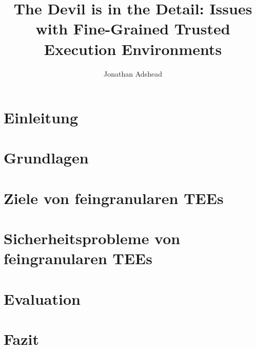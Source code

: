 \documentclass[sigconf]{acmart}
\title{The Devil is in the Detail: Issues with Fine-Grained Trusted Execution Environments}
\author{Jonathan Adshead}
\affiliation{
    \institution{Friedricht-Alexander-Universität Erlangen-Nürnberg}
    \country{}}
\begin{document}
\maketitle  %







\section{Einleitung}


\section{Grundlagen}


\section{Ziele von feingranularen TEEs}


\section{Sicherheitsprobleme von feingranularen TEEs}


\section{Evaluation}


\section{Fazit}




\end{document}
